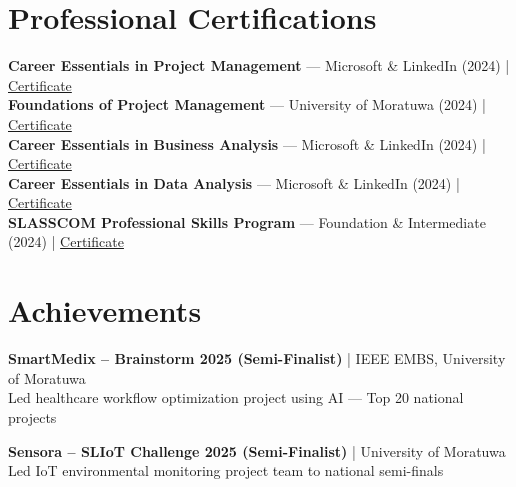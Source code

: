 \documentclass[letterpaper,10pt]{article}
\begin{document}
\section{Professional Certifications}
\vspace{-1pt}

\textbf{Career Essentials in Project Management} — Microsoft \& LinkedIn (2024) | \href{https://www.linkedin.com/posts/vindya-kodithuwakku-bb6187202_projectmanagement-careeressentials-microsoft-activity-7374470702059438080-zbfj}{Certificate}\\
\textbf{Foundations of Project Management} — University of Moratuwa (2024) | \href{https://open.uom.lk/lms/mod/customcert/verify_certificate.php?code=ATuxOYBBAE&qrcode=1}{Certificate}\\
\textbf{Career Essentials in Business Analysis} — Microsoft \& LinkedIn (2024) | \href{https://www.linkedin.com/posts/vindya-kodithuwakku-bb6187202_businessanalysis-careeressentials-microsoft-activity-7371193871919398914-PKak}{Certificate}\\
\textbf{Career Essentials in Data Analysis} — Microsoft \& LinkedIn (2024) | \href{https://www.linkedin.com/posts/vindya-kodithuwakku-bb6187202_dataanalysis-careeressentials-microsoft-activity-7379124237950750720-kKmD}{Certificate}\\
\textbf{SLASSCOM Professional Skills Program} — Foundation \& Intermediate (2024) | \href{https://www.linkedin.com/posts/vindya-kodithuwakku-bb6187202_slasscom-professionalskillsprogram-careerdevelopment-activity-7379038487246860288-PRA0}{Certificate}

\section{Achievements}
\vspace{-1pt}

\textbf{SmartMedix – Brainstorm 2025 (Semi-Finalist)} | IEEE EMBS, University of Moratuwa\\
Led healthcare workflow optimization project using AI — Top 20 national projects

\textbf{Sensora – SLIoT Challenge 2025 (Semi-Finalist)} | University of Moratuwa\\
Led IoT environmental monitoring project team to national semi-finals

\end{document}
